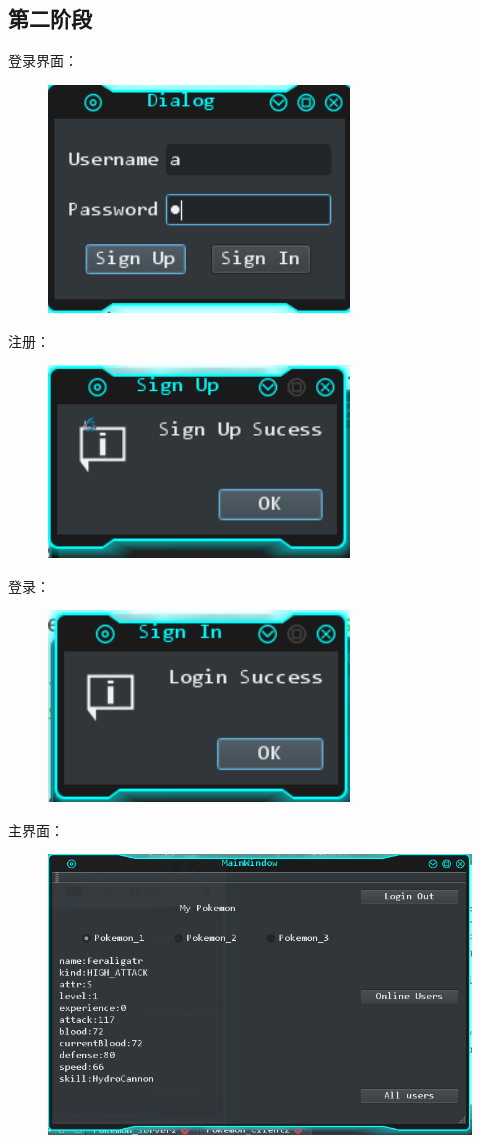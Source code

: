 \documentclass{ctexart}
\begin{document}
\subsection{第二阶段}
登录界面：
\begin{figure}[H]
  \centering
  \includegraphics[width=8cm]{stage2-login.png}
\end{figure}
注册：
\begin{figure}[H]
  \centering
  \includegraphics[width=8cm]{stage2-signup.png}
\end{figure}
登录：
\begin{figure}[H]
  \centering
  \includegraphics[width=8cm]{stage2-signin.png}
\end{figure}
\pagebreak[4]
主界面：
\begin{figure}[H]
  \centering
  \includegraphics[width=15cm]{stage2-main.png}
\end{figure}
\end{document}
